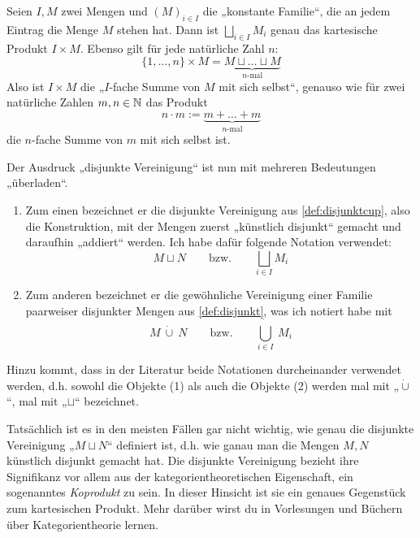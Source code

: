     
\begin{bem}
    Seien $I,M$ zwei Mengen und $(M)_{i\in I}$ die „konstante Familie“, die an jedem Eintrag die Menge $M$ stehen hat. Dann ist $\bigsqcup_{i\in I} M_i$ genau das kartesische Produkt $I\times M$. Ebenso gilt für jede natürliche Zahl $n$:
        \[ \{1,\dots , n\} \times M = \underbrace{M\sqcup\ldots\sqcup M}_{\text{$n$-mal}} \]
    Also ist $I\times M$ die „$I$-fache Summe von $M$ mit sich selbst“, genauso wie für zwei natürliche Zahlen $m,n\in \mathbb N$ das Produkt
        \[ n\cdot m := \underbrace{m +\ldots + m}_{\text{$n$-mal}}\]
    die $n$-fache Summe von $m$ mit sich selbst ist.
\end{bem}


\begin{vorschau}
    Der Ausdruck „disjunkte Vereinigung“ ist nun mit mehreren Bedeutungen „überladen“.
    \begin{enumerate}[(1)]
        \item Zum einen bezeichnet er die disjunkte Vereinigung aus \cref{def:disjunktcup}, also die Konstruktion, mit der Mengen zuerst „künstlich disjunkt“ gemacht und daraufhin „addiert“ werden. Ich habe dafür folgende Notation verwendet:
            \[ M\sqcup N \qquad\text{bzw.}\qquad \bigsqcup_{i\in I} M_i \]
        \item Zum anderen bezeichnet er die gewöhnliche Vereinigung einer Familie paarweiser disjunkter Mengen aus \cref{def:disjunkt}, was ich notiert habe mit
            \[ M\ \dot\cup\ N \qquad\text{bzw.}\qquad   \dot{\bigcup_{i\in I}}\ M_i \]
    \end{enumerate}
    Hinzu kommt, dass in der Literatur beide Notationen durcheinander verwendet werden, d.h. sowohl die Objekte (1) als auch die Objekte (2) werden mal mit „$\dot\cup$“, mal mit „$\sqcup$“ bezeichnet.
    
    Tatsächlich ist es in den meisten Fällen gar nicht wichtig, wie genau die disjunkte Vereinigung „$M \sqcup N$“ definiert ist, d.h. wie ganau man die Mengen $M,N$ künstlich disjunkt gemacht hat. Die disjunkte Vereinigung bezieht ihre Signifikanz vor allem aus der kategorientheoretischen Eigenschaft, ein sogenanntes \emph{Koprodukt} zu sein. In dieser Hinsicht ist sie ein genaues Gegenstück zum kartesischen Produkt. Mehr darüber wirst du in Vorlesungen und Büchern über Kategorientheorie lernen.
\end{vorschau}





